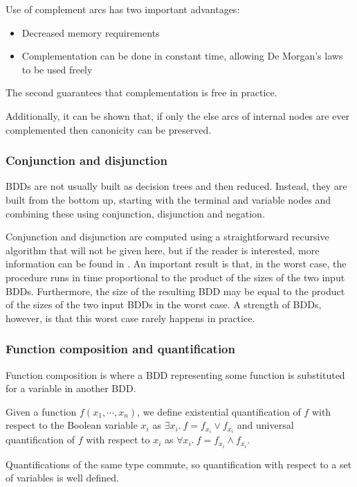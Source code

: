 Use of complement arcs has two important advantages:
\begin{itemize}
    \item Decreased memory requirements
    \item Complementation can be done in constant time, allowing De Morgan's laws to be used freely
\end{itemize}

The second guarantees that complementation is free in practice.

Additionally, it can be shown that, if only the else arcs of internal nodes are ever complemented then canonicity can be preserved.

\subsubsection{Conjunction and disjunction}

BDDs are not usually built as decision trees and then reduced. Instead, they are built from the bottom up, starting with the terminal and variable nodes and combining these using conjunction, disjunction and negation.

Conjunction and disjunction are computed using a straightforward recursive algorithm that will not be given here, but if the reader is interested, more information can be found in \cite{Bryant_86}. An important result is that, in the worst case, the procedure runs in time proportional to the product of the sizes of the two input BDDs. Furthermore, the size of the resulting BDD may be equal to the product of the sizes of the two input BDDs in the worst case. A strength of BDDs, however, is that this worst case rarely happens in practice. 

\subsubsection{Function composition and quantification}

Function composition is where a BDD representing some function is substituted for a variable in another BDD.

Given a function $f(x_1,\cdots,x_n)$, we define existential quantification of $f$ with respect to the Boolean variable $x_i$ as $\exists x_i.\ f = f_{x_i} \vee f_{\overline{x_i}}$ and universal quantification of $f$ with respect to $x_i$ as $\forall x_i.\ f = f_{x_i} \wedge f_{\overline{x_i}}$.

Quantifications of the same type commute, so quantification with respect to a set of variables is well defined. 

